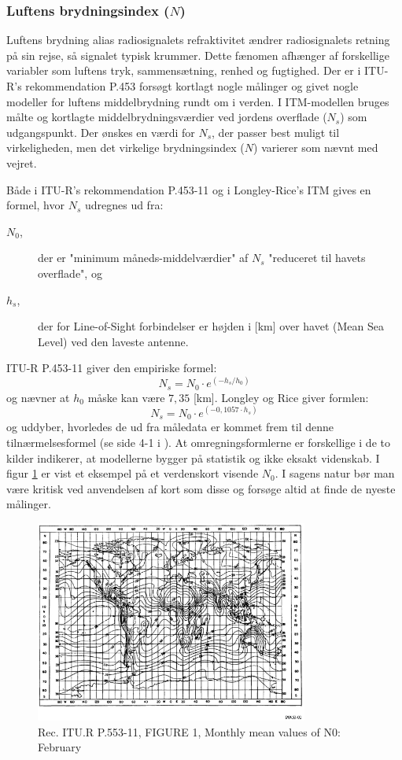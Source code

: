 \subsubsection{Luftens brydningsindex ($N$)}\label{N}
Luftens brydning alias radiosignalets refraktivitet ændrer radiosignalets retning på sin rejse, så signalet typisk krummer. Dette fænomen afhænger af forskellige variabler som luftens tryk, sammensætning, renhed og fugtighed. Der er i ITU-R's rekommendation P.453 \cite{itur_p453-11} forsøgt kortlagt nogle målinger og givet nogle modeller for luftens middelbrydning rundt om i verden. I ITM-modellen bruges målte og kortlagte middelbrydningsværdier ved jordens overflade ($N_s$) som udgangspunkt. Der ønskes en værdi for $N_s$, der passer best muligt til virkeligheden, men det virkelige brydningsindex ($N$) varierer som nævnt med vejret.
\par
Både i ITU-R's rekommendation P.453-11 og i Longley-Rice's ITM gives en formel, hvor $N_s$ udregnes ud fra: 
\begin{description}
	\item[$N_0$,] der er "minimum måneds-middelværdier" af $N_s$ "reduceret til havets overflade", og
	\item[$h_s$,] der for Line-of-Sight forbindelser er højden i [km] over havet (Mean Sea Level) ved den laveste antenne.
\end{description}
ITU-R P.453-11 giver den empiriske formel:
\begin{equation}
N_s = N_0 \cdot e^{(-h_s / h_0)}
\end{equation}
og nævner at $h_0$ måske kan være $7,35$ [km]. Longley og Rice giver formlen:
\begin{equation}
N_s = N_0 \cdot e^{(-0,1057 \cdot h_s)}
\end{equation}
og uddyber, hvorledes de ud fra måledata er kommet frem til denne tilnærmelsesformel (se side 4-1 i \cite{nbs-tn101}). At omregningsformlerne er forskellige i de to kilder indikerer, at modellerne bygger på statistik og ikke eksakt videnskab. I figur \ref{fig:N0} er vist et eksempel på et verdenskort visende $N_0$. I sagens natur bør man være kritisk ved anvendelsen af kort som disse og forsøge altid at finde de nyeste målinger.

\begin{figure}[h]
 \centering
 \includegraphics[width=0.8\textwidth]{figure/itur,P453,fig01.JPG}
 \caption{Rec. ITU.R P.553-11, FIGURE 1, Monthly mean values of N0: February}
 \label{fig:N0}
\end{figure}
 
